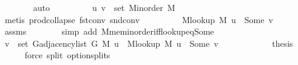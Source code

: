 \begin{isabellebody}
\ \ \ \ \ \ \isamarkupfalse%
\ auto\isanewline
\ \ \ \ \isamarkupfalse%
\ \isamarkupfalse%
\ {\isachardoublequoteopen}{\isachardot}{\kern0pt}{\isachardot}{\kern0pt}{\isachardot}{\kern0pt}\ {\isasymlongleftrightarrow}\ {\isacharparenleft}{\kern0pt}u{\isacharcomma}{\kern0pt}\ v{\isacharparenright}{\kern0pt}\ {\isasymin}\ set\ {\isacharparenleft}{\kern0pt}M{\isacharunderscore}{\kern0pt}inorder\ M{\isacharparenright}{\kern0pt}{\isachardoublequoteclose}\isanewline
\ \ \ \ \ \ \isamarkupfalse%
\ {\isacharparenleft}{\kern0pt}metis\ prod{\isachardot}{\kern0pt}collapse\ fst{\isacharunderscore}{\kern0pt}conv\ snd{\isacharunderscore}{\kern0pt}conv{\isacharparenright}{\kern0pt}\isanewline
\ \ \ \ \isamarkupfalse%
\ \isamarkupfalse%
\ {\isachardoublequoteopen}{\isachardot}{\kern0pt}{\isachardot}{\kern0pt}{\isachardot}{\kern0pt}\ {\isasymlongleftrightarrow}\ M{\isacharunderscore}{\kern0pt}lookup\ M\ u\ {\isacharequal}{\kern0pt}\ Some\ v{\isachardoublequoteclose}\isanewline
\ \ \ \ \ \ \isamarkupfalse%
\ assms\isanewline
\ \ \ \ \ \ \isamarkupfalse%
\ {\isacharparenleft}{\kern0pt}simp\ add{\isacharcolon}{\kern0pt}\ M{\isachardot}{\kern0pt}mem{\isacharunderscore}{\kern0pt}inorder{\isacharunderscore}{\kern0pt}iff{\isacharunderscore}{\kern0pt}lookup{\isacharunderscore}{\kern0pt}eq{\isacharunderscore}{\kern0pt}Some{\isacharparenright}{\kern0pt}\isanewline
\ \ \ \ \isamarkupfalse%
\ \isamarkupfalse%
\ {\isachardoublequoteopen}v\ {\isasymin}\ set\ {\isacharparenleft}{\kern0pt}G{\isachardot}{\kern0pt}adjacency{\isacharunderscore}{\kern0pt}list\ {\isacharparenleft}{\kern0pt}G{}{\isacharunderscore}{\kern0pt}{}\ M{\isacharparenright}{\kern0pt}\ u{\isacharparenright}{\kern0pt}\ {\isasymlongleftrightarrow}\ M{\isacharunderscore}{\kern0pt}lookup\ M\ u\ {\isacharequal}{\kern0pt}\ Some\ v{\isachardoublequoteclose}\isanewline
\ \ \ \ \ \ \isacommand{{\isachardot}{\kern0pt}}\isamarkupfalse%
\ \isacommand{{\isacharbraceright}{\kern0pt}}\isamarkupfalse%
\isanewline
\ \ \isamarkupfalse%
\ {\isacharquery}{\kern0pt}thesis\isanewline
\ \ \ \ \isamarkupfalse%
\ {\isacharparenleft}{\kern0pt}force\ split{\isacharcolon}{\kern0pt}\ option{\isachardot}{\kern0pt}splits{\isacharparenleft}{\kern0pt}{}{\isacharparenright}{\kern0pt}{\isacharparenright}{\kern0pt}\isanewline
{}\isamarkupfalse%
%
\endisatagproof
{\isafoldproof}%
%
\isadelimproof
%
\endisadelimproof

\end{isabellebody}
